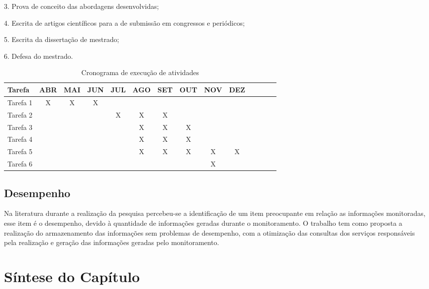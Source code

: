   3. Prova de conceito das abordagens desenvolvidas;
    
  4. Escrita de artigos científicos para a de submissão em congressos e periódicos;
  
  5. Escrita da dissertação de mestrado;
  
  6. Defesa do mestrado.

\begin{table}[!htpb]
	\centering
	\caption{Cronograma de execução de atividades}
	\begin{center}
		\begin{tabular}{|l|c|c|c|c|c|c|c|c|c|c|c|c|c|} \hline
Tarefa&ABR&MAI&JUN&JUL&AGO&SET&OUT&NOV&DEZ\\
			\hline
			Tarefa 1 &X&X&X& & & & & & \\
			\hline
			Tarefa 2 & & & &X&X&X& & & \\
			\hline
			Tarefa 3 & & & & &X&X&X& & \\
			\hline
			Tarefa 4 & & & & &X&X&X& & \\
			\hline
			Tarefa 5 & & & &&X&X&X&X&X \\
			\hline
			Tarefa 6 & & & & & & & & X& \\
			\hline
		\end{tabular}
		\label{tab:cronograma}
	\end{center}
\end{table} 


\selectfont%


\subsection{Desempenho}

Na literatura durante a realização da pesquisa percebeu-se a identificação de um item preocupante em relação as informações monitoradas, esse item é o desempenho, devido à quantidade de informações geradas durante o monitoramento. O trabalho tem como proposta a realização do armazenamento das informações sem problemas de desempenho, com a otimização das consultas dos serviços responsáveis pela realização e geração das informações geradas pelo monitoramento.   

\section{Síntese do Capítulo}